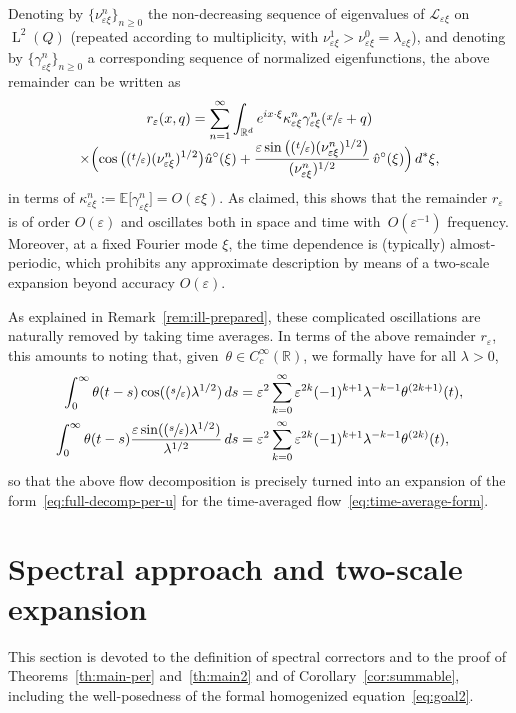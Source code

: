 \documentclass[10pt]{amsart}
\newcommand{\Psfrac}[2]{(\sfrac{#1}{#2})}
\theoremstyle{plain}
\theoremstyle{definition}
\numberwithin{equation}{section}
\newcommand{\e}{\varepsilon}
\newcommand{\Lc}{\mathcal{L}}
\newcommand{\R}{\mathbb R}
\newcommand{\Ld}{\operatorname{L}}
\newcommand{\expecm}[1]{\mathbb{E}\bigl[ #1 \bigr]}\let\bexpec\expecm
\begin{document}
Denoting by $\{\nu_{\e\xi}^n\}_{n\ge0}$ the non-decreasing sequence of eigenvalues of $\Lc_{\e\xi}$ on $\Ld^2(Q)$ (repeated according to multiplicity, with $\nu_{\e\xi}^1>\nu_{\e\xi}^0=\lambda_{\e\xi}$), and denoting by $\{\gamma_{\e\xi}^n\}_{n\ge0}$ a corresponding sequence of normalized eigenfunctions, the above remainder can be written as
\begin{multline*}
r_\e(x,q)
=\sum_{n=1}^\infty\int_{\R^d}e^{ix\cdot\xi}\kappa^n_{\e\xi}\gamma_{\e\xi}^n(\sfrac x\e+q)\\[-5pt]
\times\Bigl(\cos\big(\Psfrac t\e(\nu_{\e\xi}^n)^{1/2}\big)\hat u^\circ(\xi)
+\frac{\e\sin\big(\Psfrac t\e(\nu^n_{\e\xi})^{1/2}\big)}{(\nu^n_{\e\xi})^{1/2}}\,\hat v^\circ(\xi)\Bigr)\,d^*\xi,
\end{multline*}
in terms of $\kappa^n_{\e\xi}:=\expecm{\gamma_{\e\xi}^n}=O(\e\xi)$.
As claimed, this shows that the remainder $r_{\e}$ is of order $O(\e)$ and oscillates both in space and time with~$O(\e^{-1})$ frequency. Moreover, at a fixed Fourier mode $\xi$, the time dependence is (typically) almost-periodic, which prohibits any approximate description by means of a two-scale expansion beyond accuracy $O(\e)$.

As explained in Remark~\ref{rem:ill-prepared}, these complicated oscillations are naturally removed by taking time averages. In terms of the above remainder $r_\e$, this amounts to noting that, given~$\theta\in C^\infty_c(\R)$, we formally have for all $\lambda>0$,
\begin{align*}
\int_0^\infty\theta(t-s)\cos(\Psfrac s\e\lambda^{1/2})\,ds
&=\e^2\sum_{k=0}^\infty\e^{2k}{(-1)^{k+1}}\lambda^{-k-1}\theta^{(2k+1)}(t),\\
\int_0^\infty\theta(t-s)\frac{\e\sin(\Psfrac s\e\lambda^{1/2})}{\lambda^{1/2}}\,ds
&=\e^2\sum_{k=0}^\infty\e^{2k}{(-1)^{k+1}}\lambda^{-k-1}\theta^{(2k)}(t),
\end{align*}
so that the above flow decomposition is precisely turned into an expansion of the form~\eqref{eq:full-decomp-per-u} for the time-averaged flow~\eqref{eq:time-average-form}.

\section{Spectral approach and two-scale expansion}\label{sec:spectral}
This section is devoted to the definition of spectral correctors and to the proof of Theorems~\ref{th:main-per} and~\ref{th:main2} and of Corollary~\ref{cor:summable}, including the well-posedness of the formal homogenized equation~\eqref{eq:goal2}.
\end{document}
